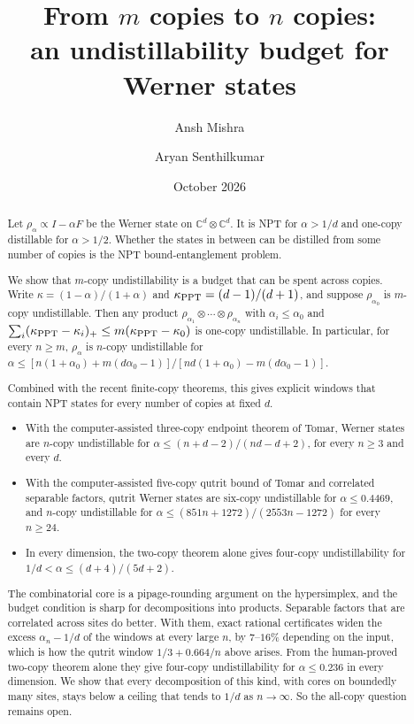 \documentclass[11pt]{article}
\title{From $m$ copies to $n$ copies:\\ an undistillability budget for Werner states}
\author{Ansh Mishra \and Aryan Senthilkumar}
\date{October 2026}
\theoremstyle{remark}
\begin{document}
\maketitle

\begin{abstract}
Let $\rho_\alpha\propto I-\alpha F$ be the Werner state on $\mathbb C^d\otimes\mathbb C^d$. It is NPT for $\alpha>1/d$
and one-copy distillable for $\alpha>1/2$. Whether the states in between can be distilled from some number of copies
is the NPT bound-entanglement problem.

We show that $m$-copy undistillability is a budget that can be spent across copies. Write $\kappa=(1-\alpha)/(1+\alpha)$
and $\kappa_{\rm PPT}=(d-1)/(d+1)$, and suppose $\rho_{\alpha_0}$ is $m$-copy undistillable. Then any product
$\rho_{\alpha_1}\otimes\cdots\otimes\rho_{\alpha_n}$ with $\alpha_i\le\alpha_0$ and
$\sum_i(\kappa_{\rm PPT}-\kappa_i)_+\le m(\kappa_{\rm PPT}-\kappa_0)$ is one-copy undistillable. In particular, for
every $n\ge m$, $\rho_\alpha$ is $n$-copy undistillable for
$\alpha\le[n(1+\alpha_0)+m(d\alpha_0-1)]/[nd(1+\alpha_0)-m(d\alpha_0-1)]$.

Combined with the recent finite-copy theorems, this gives explicit windows that contain NPT states for every number
of copies at fixed $d$.
\begin{itemize}
\item With the computer-assisted three-copy endpoint theorem of Tomar, Werner states are $n$-copy undistillable for
$\alpha\le(n+d-2)/(nd-d+2)$, for every $n\ge3$ and every $d$.
\item With the computer-assisted five-copy qutrit bound of Tomar and correlated separable factors, qutrit Werner states are six-copy undistillable for $\alpha\le0.4469$,
and $n$-copy undistillable for $\alpha\le(851n+1272)/(2553n-1272)$ for every $n\ge24$.
\item In every dimension, the two-copy theorem alone gives four-copy undistillability for $1/d<\alpha\le(d+4)/(5d+2)$.
\end{itemize}

The combinatorial core is a pipage-rounding argument on the hypersimplex, and the budget condition is sharp for
decompositions into products. Separable factors that are correlated across sites do better. With them, exact rational
certificates widen the excess $\alpha_n-1/d$ of the windows at every large $n$, by $7$--$16\%$ depending on the input,
which is how the qutrit window $1/3+0.664/n$ above arises. From the human-proved two-copy theorem alone they give four-copy
undistillability for $\alpha\le0.236$ in every dimension. We show that every decomposition of this kind, with cores on
boundedly many sites, stays below a ceiling that tends to $1/d$ as $n\to\infty$. So the all-copy question remains
open.
\end{abstract}
\end{document}
